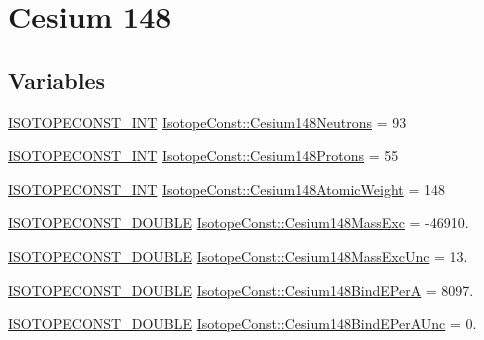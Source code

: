 \hypertarget{group___isotope_const-_cesium-_cs148}{}\section{Cesium 148}
\label{group___isotope_const-_cesium-_cs148}
\subsection*{Variables}
\begin{DoxyCompactItemize}
\item 
\mbox{\hyperlink{group___isotope_const-_macros_ga5f18360b3e99483a35c32d789e62621c}{I\+S\+O\+T\+O\+P\+E\+C\+O\+N\+S\+T\+\_\+\+I\+NT}} \mbox{\hyperlink{group___isotope_const-_cesium-_cs148_gabbf9fd2fecfeddd909dafd02b92e9083}{Isotope\+Const\+::\+Cesium148\+Neutrons}} = 93
\item 
\mbox{\hyperlink{group___isotope_const-_macros_ga5f18360b3e99483a35c32d789e62621c}{I\+S\+O\+T\+O\+P\+E\+C\+O\+N\+S\+T\+\_\+\+I\+NT}} \mbox{\hyperlink{group___isotope_const-_cesium-_cs148_ga833dfc271794e45d98d52f19474aa1b7}{Isotope\+Const\+::\+Cesium148\+Protons}} = 55
\item 
\mbox{\hyperlink{group___isotope_const-_macros_ga5f18360b3e99483a35c32d789e62621c}{I\+S\+O\+T\+O\+P\+E\+C\+O\+N\+S\+T\+\_\+\+I\+NT}} \mbox{\hyperlink{group___isotope_const-_cesium-_cs148_gacec8341b2f264ab4a0547c7cbd7ab1b8}{Isotope\+Const\+::\+Cesium148\+Atomic\+Weight}} = 148
\item 
\mbox{\hyperlink{group___isotope_const-_macros_ga8f45a7272ce02c0b4c65c44636ed719a}{I\+S\+O\+T\+O\+P\+E\+C\+O\+N\+S\+T\+\_\+\+D\+O\+U\+B\+LE}} \mbox{\hyperlink{group___isotope_const-_cesium-_cs148_ga5f2ed2a9aa5f9fe4d617a827d9e0925b}{Isotope\+Const\+::\+Cesium148\+Mass\+Exc}} = -\/46910.
\item 
\mbox{\hyperlink{group___isotope_const-_macros_ga8f45a7272ce02c0b4c65c44636ed719a}{I\+S\+O\+T\+O\+P\+E\+C\+O\+N\+S\+T\+\_\+\+D\+O\+U\+B\+LE}} \mbox{\hyperlink{group___isotope_const-_cesium-_cs148_ga5c1fc00c22280f1f3fde156583f6aff6}{Isotope\+Const\+::\+Cesium148\+Mass\+Exc\+Unc}} = 13.
\item 
\mbox{\hyperlink{group___isotope_const-_macros_ga8f45a7272ce02c0b4c65c44636ed719a}{I\+S\+O\+T\+O\+P\+E\+C\+O\+N\+S\+T\+\_\+\+D\+O\+U\+B\+LE}} \mbox{\hyperlink{group___isotope_const-_cesium-_cs148_ga54ee78d3797f9bb0786d86f68276bcd7}{Isotope\+Const\+::\+Cesium148\+Bind\+E\+PerA}} = 8097.
\item 
\mbox{\hyperlink{group___isotope_const-_macros_ga8f45a7272ce02c0b4c65c44636ed719a}{I\+S\+O\+T\+O\+P\+E\+C\+O\+N\+S\+T\+\_\+\+D\+O\+U\+B\+LE}} \mbox{\hyperlink{group___isotope_const-_cesium-_cs148_ga0df169f381e1a5a214fa5f52443800ed}{Isotope\+Const\+::\+Cesium148\+Bind\+E\+Per\+A\+Unc}} = 0.

\end{DoxyCompactItemize}
